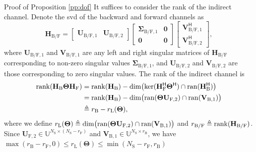 \documentclass[journal]{IEEEtran}
\begin{document}
\begin{appendix}
	\begin{subsection}{Proof of Proposition \ref{pp:dof}}
		\label{ap:dof}
		It suffices to consider the rank of the indirect channel.
		Denote the \gls{svd} of the backward and forward channels as
		\begin{equation*}
			\mathbf{H}_\mathrm{B/F} = \begin{bmatrix}
				\mathbf{U}_{\mathrm{B/F},1} & \mathbf{U}_{\mathrm{B/F},2}
			\end{bmatrix}
			\begin{bmatrix}
				\mathbf{\Sigma}_{\mathrm{B/F},1} & \mathbf{0} \\
				\mathbf{0}                     & \mathbf{0}
			\end{bmatrix}
			\begin{bmatrix}
				\mathbf{V}_{\mathrm{B/F},1}^\mathsf{H} \\
				\mathbf{V}_{\mathrm{B/F},2}^\mathsf{H}
			\end{bmatrix},
		\end{equation*}
		where $\mathbf{U}_{\mathrm{B/F},1}$ and $\mathbf{V}_{\mathrm{B/F},1}$ are any left and right singular matrices of $\mathbf{H}_\mathrm{B/F}$ corresponding to non-zero singular values $\mathbf{\Sigma}_{\mathrm{B/F},1}$, and $\mathbf{U}_{\mathrm{B/F},2}$ and $\mathbf{V}_{\mathrm{B/F},2}$ are those corresponding to zero singular values.
		The rank of the indirect channel is \cite[(16.5.10.b)]{Hogben2013}
		\begin{equation*}
			\begin{split}
				\operatorname{rank}(\mathbf{H}_\mathrm{B} \mathbf{\Theta} \mathbf{H}_\mathrm{F})
				& = \operatorname{rank}(\mathbf{H}_\mathrm{B}) - \dim \bigl(\ker(\mathbf{H}_\mathrm{F}^\mathsf{H} \mathbf{\Theta}^\mathsf{H}) \cap \operatorname{ran}(\mathbf{H}_\mathrm{B}^\mathsf{H})\bigr) \\
				& = \operatorname{rank}(\mathbf{H}_\mathrm{B}) - \dim \bigl(\operatorname{ran}(\mathbf{\Theta} \mathbf{U}_{\mathrm{F},2}) \cap \operatorname{ran}(\mathbf{V}_{\mathrm{B},1})\bigr) \\
				& \triangleq r_\mathrm{B} - r_\mathrm{L}(\mathbf{\Theta}),
			\end{split}
		\end{equation*}
		where we define $r_\mathrm{L}(\mathbf{\Theta}) \triangleq \dim \bigl(\operatorname{ran}(\mathbf{\Theta} \mathbf{U}_{\mathrm{F},2}) \cap \operatorname{ran}(\mathbf{V}_{\mathrm{B},1})\bigr)$ and $r_\mathrm{B/F} \triangleq \operatorname{rank}(\mathbf{H}_\mathrm{B/F})$.
		Since $\mathbf{U}_{\mathrm{F},2} \in \mathbb{U}^{N_\mathrm{S} \times (N_\mathrm{S} - r_\mathrm{F})}$ and $\mathbf{V}_{\mathrm{B},1} \in \mathbb{U}^{N_\mathrm{S} \times r_\mathrm{B}}$, we have $\max(r_\mathrm{B} - r_\mathrm{F}, 0) \le r_\mathrm{L}(\mathbf{\Theta}) \le \min(N_\mathrm{S} - r_\mathrm{F}, r_\mathrm{B})$

\end{subsection}
\end{appendix}
\end{document}

